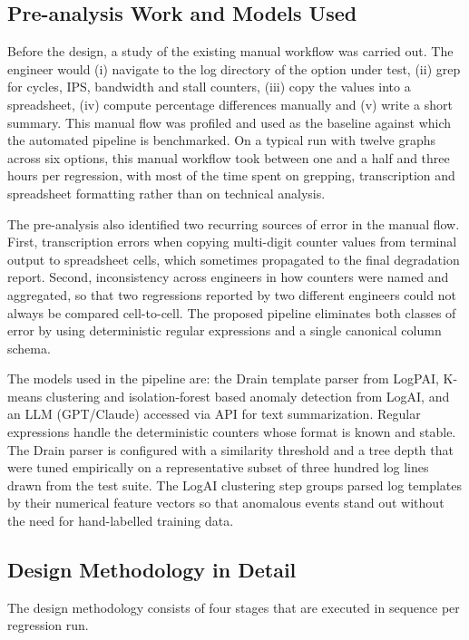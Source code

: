 \subsection{Pre-analysis Work and Models Used}
Before the design, a study of the existing manual workflow was carried out. The engineer would (i) navigate to the log directory of the option under test, (ii) grep for cycles, IPS, bandwidth and stall counters, (iii) copy the values into a spreadsheet, (iv) compute percentage differences manually and (v) write a short summary. This manual flow was profiled and used as the baseline against which the automated pipeline is benchmarked. On a typical run with twelve graphs across six options, this manual workflow took between one and a half and three hours per regression, with most of the time spent on grepping, transcription and spreadsheet formatting rather than on technical analysis.

The pre-analysis also identified two recurring sources of error in the manual flow. First, transcription errors when copying multi-digit counter values from terminal output to spreadsheet cells, which sometimes propagated to the final degradation report. Second, inconsistency across engineers in how counters were named and aggregated, so that two regressions reported by two different engineers could not always be compared cell-to-cell. The proposed pipeline eliminates both classes of error by using deterministic regular expressions and a single canonical column schema.

The models used in the pipeline are: the Drain template parser from LogPAI, K-means clustering and isolation-forest based anomaly detection from LogAI, and an LLM (GPT/Claude) accessed via API for text summarization. Regular expressions handle the deterministic counters whose format is known and stable. The Drain parser is configured with a similarity threshold and a tree depth that were tuned empirically on a representative subset of three hundred log lines drawn from the test suite. The LogAI clustering step groups parsed log templates by their numerical feature vectors so that anomalous events stand out without the need for hand-labelled training data.

\subsection{Design Methodology in Detail}
The design methodology consists of four stages that are executed in sequence per regression run.

